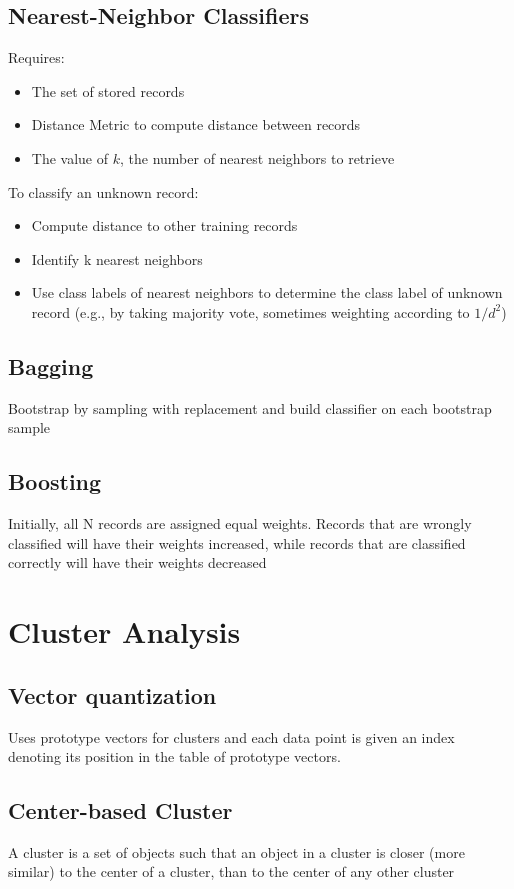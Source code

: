 \documentclass[12pt]{amsart}
\begin{document}
\subsection{Nearest-Neighbor Classifiers}
Requires:
\begin{itemize}
  \item The set of stored records
\item Distance Metric to compute
distance between records
\item The value of $k$, the number of
nearest neighbors to retrieve 
\end{itemize}
To classify an unknown record:
\begin{itemize}
\item Compute distance to other
training records
\item Identify k nearest neighbors
\item Use class labels of nearest
neighbors to determine the
class label of unknown record
(e.g., by taking majority vote, sometimes weighting according to $1/d^2$)
\end{itemize}



\subsection{Bagging}
Bootstrap by sampling with replacement and build classifier on each bootstrap sample


\subsection{Boosting}
Initially, all N records are assigned equal
weights. Records that are wrongly classified will have their
weights increased, while records that are classified correctly will have
their weights decreased


\section{Cluster Analysis}

\subsection{Vector quantization} Uses prototype vectors for clusters and each data point is given an index denoting its position in the table of prototype vectors.

\subsection{Center-based Cluster}
A cluster is a set of objects such that an object in a cluster is
closer (more similar) to the center of a cluster, than to the
center of any other cluster
\end{document}
